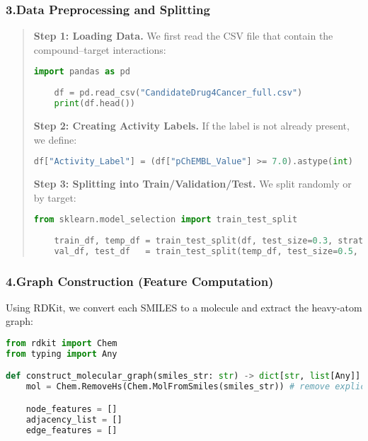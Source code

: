 \documentclass[fontsize=11pt]{article}
\begin{document}
\begin{itemize}
\begin{quote}
\end{quote}

\subsubsection*{3.\quad Data Preprocessing and Splitting}

\begin{quote}
    \textbf{Step 1: Loading Data.} We first read the CSV file that contain the compound--target interactions:
    \begin{lstlisting}[language=Python]
    import pandas as pd
    
    df = pd.read_csv("CandidateDrug4Cancer_full.csv") 
    print(df.head())
    \end{lstlisting}
    
    \noindent
    \textbf{Step 2: Creating Activity Labels.} If the label is not already present, we define:
    \begin{lstlisting}[language=Python]
    df["Activity_Label"] = (df["pChEMBL_Value"] >= 7.0).astype(int)
    \end{lstlisting}
    
    \noindent
    \textbf{Step 3: Splitting into Train/Validation/Test.} We split randomly or by target:
    \begin{lstlisting}[language=Python]
    from sklearn.model_selection import train_test_split
    
    train_df, temp_df = train_test_split(df, test_size=0.3, stratify=df["Activity_Label"])
    val_df, test_df   = train_test_split(temp_df, test_size=0.5, stratify=temp_df["Activity_Label"])
    \end{lstlisting}
\end{quote}

\subsubsection*{4.\quad Graph Construction (Feature Computation)}
Using RDKit, we convert each SMILES to a molecule and extract the heavy-atom graph:

\begin{lstlisting}[language=Python]
from rdkit import Chem
from typing import Any

def construct_molecular_graph(smiles_str: str) -> dict[str, list[Any]]:
    mol = Chem.RemoveHs(Chem.MolFromSmiles(smiles_str)) # remove explicit H atoms

    node_features = []
    adjacency_list = []
    edge_features = []


\end{lstlisting}
\end{itemize}
\end{document}
